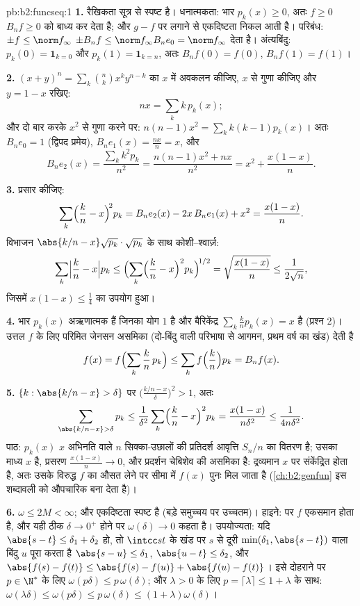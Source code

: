 \begin{solution}{pb:b2:funcseq:1}
\textbf{1.} रैखिकता सूत्र से स्पष्ट है। धनात्मकता: भार $p_k(x) \geq 0$, अतः $f \geq 0$ $B_nf \geq
0$
को बाध्य कर देता है; और $g - f$ पर लगाने से एकदिष्टता निकल आती है। परिबंध:
$\pm f \leq
\norm f_\infty$ $\pm B_nf \leq \norm f_\infty B_ne_0 =
\norm f_\infty$ देता है। अंत्यबिंदु: $p_k(0) = \mathbf 1_{k=0}$ और $p_k(1) = \mathbf 1_{k=n}$, अतः $B_nf(0) = f(0)$, $B_nf(1) =
f(1)$।

\textbf{2.} $(x+y)^n = \sum_k\binom nk x^ky^{n-k}$ का $x$ में अवकलन कीजिए, $x$ से गुणा कीजिए और $y = 1 - x$ रखिए:
\[
nx = \sum_k k\,p_k(x) ;
\]
और दो बार करके $x^2$ से गुणा करने पर: $n(n-1)x^2 = \sum_k k(k-1)p_k(x)$। अतः $B_ne_0 = 1$ (द्विपद प्रमेय), $B_ne_1(x) =
\frac{nx}{n} = x$,
और
\[
B_ne_2(x) = \frac{\sum_k k^2p_k}{n^2}
= \frac{n(n-1)x^2 + nx}{n^2}
= x^2 + \frac{x(1-x)}{n} .
\]

\textbf{3.} प्रसार कीजिए:
\[
\sum_k\Bigl(\frac kn - x\Bigr)^{\!2} p_k
= B_ne_2(x) - 2x\,B_ne_1(x) + x^2
= \frac{x(1-x)}{n} .
\]
विभाजन $\abs{k/n - x}\sqrt{p_k}
\cdot \sqrt{p_k}$ के साथ कोशी--श्वार्ज़:
\[
\sum_k\Bigl|\frac kn - x\Bigr| p_k
\leq \Bigl(\sum_k\Bigl(\frac kn - x\Bigr)^2
p_k\Bigr)^{\!1/2}
= \sqrt{\frac{x(1-x)}{n}} \leq \frac{1}{2\sqrt n},
\]
जिसमें $x(1-x) \leq \frac14$ का उपयोग हुआ।

\textbf{4.} भार $p_k(x)$ अऋणात्मक हैं जिनका योग $1$ है और बैरिकेंद्र $\sum_k \frac kn p_k(x) = x$ है
(प्रश्न 2)। उत्तल $f$ के लिए परिमित जेनसन असमिका (दो-बिंदु वाली परिभाषा
से आगमन, प्रथम वर्ष का खंड) देती है
\[
f(x) = f\Bigl(\sum_k \frac kn\,p_k\Bigr)
\leq \sum_k f\Bigl(\frac kn\Bigr)p_k = B_nf(x) .
\]

\textbf{5.} $\{k : \abs{k/n - x} > \delta\}$ पर $\bigl(\frac{k/n - x}{\delta}\bigr)^2 > 1$, अतः
\[
\sum_{\abs{k/n-x}>\delta} p_k
\leq \frac{1}{\delta^2}\sum_k\Bigl(\frac kn -
x\Bigr)^2p_k
= \frac{x(1-x)}{n\delta^2} \leq \frac{1}{4n\delta^2} .
\]
पाठ: $p_k(x)$ $x$ अभिनति वाले $n$ सिक्का-उछालों की प्रतिदर्श आवृत्ति $S_n/n$ का
वितरण है; उसका माध्य $x$ है, प्रसरण $\frac{x(1-x)}n \to 0$, और प्रदर्शन चेबिशेव की असमिका
है: द्रव्यमान $x$ पर संकेंद्रित होता है, अतः उसके विरुद्ध $f$ का औसत
लेने पर सीमा में $f(x)$ पुनः मिल जाता है (\cref{ch:b2:genfun} इस शब्दावली को औपचारिक बना
देता है)।

\textbf{6.} $\omega \leq 2M < \infty$; और एकदिष्टता स्पष्ट है (बड़े समुच्चय पर उच्चतम)। हाइने:
 पर  $f$ एकसमान  होता है, और यही ठीक $\delta \to 0^+$ होने पर $\omega(\delta) \to 0$ कहता है।
उपयोज्यता: यदि $\abs{s - t} \leq
\delta_1 + \delta_2$ हो, तो $\intcc st$ के खंड पर $s$ से दूरी $\min(\delta_1, \abs{s-t})$ वाला बिंदु $u$
पूरा करता है $\abs{s-u} \leq \delta_1$, $\abs{u-t} \leq \delta_2$, और $\abs{f(s)-f(t)} \leq \abs{f(s)-f(u)} + \abs{f(u)-f(t)}$। इसे दोहराने पर $p \in
\N^*$ के लिए $\omega(p\delta) \leq p\,\omega(\delta)$; और $\lambda > 0$
के लिए $p = \lceil\lambda\rceil \leq 1
+ \lambda$ के साथ: $\omega(\lambda\delta) \leq \omega(p\delta) \leq
p\,\omega(\delta) \leq (1+\lambda)\omega(\delta)$।


\end{solution}
